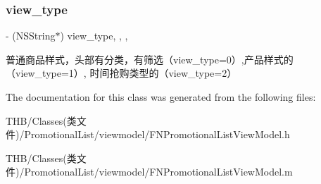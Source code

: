 \subsubsection{\texorpdfstring{view\+\_\+type}{view\_type}}
{\footnotesize\ttfamily -\/ (N\+S\+String$\ast$) view\+\_\+type\hspace{0.3cm}{\ttfamily [read]}, {\ttfamily [write]}, {\ttfamily [nonatomic]}, {\ttfamily [copy]}}

普通商品样式，头部有分类，有筛选（view\+\_\+type=0）,产品样式的（view\+\_\+type=1）, 时间抢购类型的（view\+\_\+type=2） 

The documentation for this class was generated from the following files\+:\begin{DoxyCompactItemize}
\item 
T\+H\+B/\+Classes(类文件)/\+Promotional\+List/viewmodel/F\+N\+Promotional\+List\+View\+Model.\+h\item 
T\+H\+B/\+Classes(类文件)/\+Promotional\+List/viewmodel/F\+N\+Promotional\+List\+View\+Model.\+m\end{DoxyCompactItemize}

